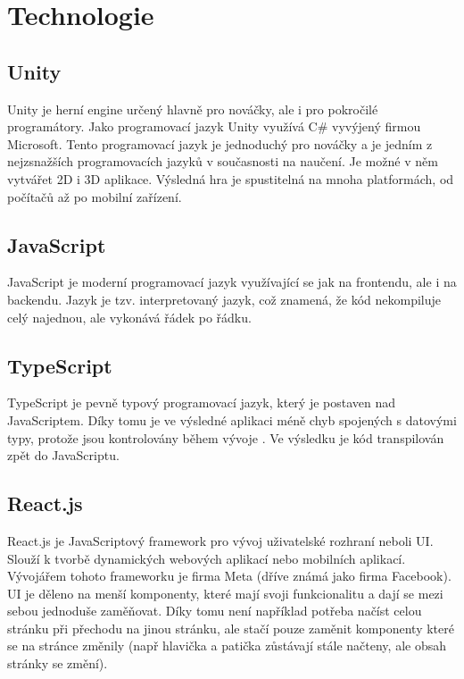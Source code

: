 \section{Technologie}

\subsection{Unity}
Unity je herní engine určený hlavně pro nováčky, ale i pro pokročilé programátory. Jako programovací jazyk Unity využívá C\# vyvýjený firmou Microsoft. Tento programovací jazyk je jednoduchý pro nováčky a je jedním z nejzsnažších programovacích jazyků v současnosti na naučení. \cite{Csharp} Je možné v něm vytvářet 2D i 3D aplikace. Výsledná hra je spustitelná na mnoha platformách, od počítačů až po mobilní zařízení.

\subsection{JavaScript}
JavaScript je moderní programovací jazyk využívající se jak na frontendu, ale i na backendu. Jazyk je tzv. interpretovaný jazyk, což znamená, že kód nekompiluje celý najednou, ale vykonává řádek po řádku.

\subsection{TypeScript}
TypeScript je pevně typový programovací jazyk, který je postaven nad JavaScriptem. \cite{TypeScript} Díky tomu je ve výsledné aplikaci méně chyb spojených s datovými typy, protože jsou kontrolovány během vývoje \cite{TypeScript}. Ve výsledku je kód transpilován zpět do JavaScriptu.

\subsection{React.js}
React.js je JavaScriptový framework pro vývoj uživatelské rozhraní neboli UI. Slouží k tvorbě dynamických webových aplikací nebo mobilních aplikací. Vývojářem tohoto frameworku je firma Meta (dříve známá jako firma Facebook). UI je děleno na menší komponenty, které mají svoji funkcionalitu a dají se mezi sebou jednoduše zaměňovat. Díky tomu není například potřeba načíst celou stránku při přechodu na jinou stránku, ale stačí pouze zaměnit komponenty které se na stránce změnily (např hlavička a patička zůstávají stále načteny, ale obsah stránky se změní).

